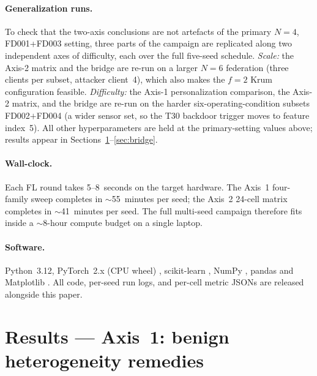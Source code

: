 \documentclass[a4paper,fleqn,doubleblind]{cas-sc}
\begin{document}
\paragraph{Generalization runs.}
To check that the two-axis conclusions are not artefacts of the
primary $N = 4$, FD001+FD003 setting, three parts of the campaign
are replicated along two independent axes of difficulty, each over
the full five-seed schedule. \emph{Scale:} the Axis-2 matrix and the
bridge are re-run on a larger $N = 6$ federation (three clients per
subset, attacker client~4), which also makes the $f = 2$ Krum
configuration feasible. \emph{Difficulty:} the Axis-1 personalization
comparison, the Axis-2 matrix, and the bridge are re-run on the
harder six-operating-condition subsets FD002$+$FD004 (a wider sensor
set, so the T30 backdoor trigger moves to feature index~5). All
other hyperparameters are held at the primary-setting values above;
results appear in Sections~\ref{sec:axis1-results}--\ref{sec:bridge}.

\paragraph{Wall-clock.}
Each FL round takes 5--8~seconds on the target hardware. The
Axis~1 four-family sweep completes in $\sim$55~minutes per seed;
the Axis~2 24-cell matrix completes in $\sim$41~minutes per seed.
The full multi-seed campaign therefore fits inside a $\sim$8-hour
compute budget on a single laptop.

\paragraph{Software.}
Python~3.12, PyTorch~2.x (CPU wheel)
\citep{Paszke2019PyTorch}, scikit-learn
\citep{Pedregosa2011Scikit}, NumPy \citep{Harris2020NumPy}, pandas
\citep{McKinney2010Pandas} and Matplotlib
\citep{Hunter2007Matplotlib}. All code, per-seed run logs, and
per-cell metric JSONs are released alongside this paper.



\section{Results --- Axis~1: benign heterogeneity remedies}
\label{sec:axis1-results}
\end{document}
